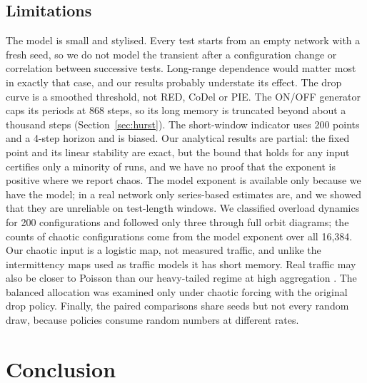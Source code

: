 \documentclass[11pt,a4paper]{article}
\begin{document}
\subsection{Limitations}
The model is small and stylised. Every test starts from an empty network with a fresh seed, so we do not model the transient after a configuration change or correlation between successive tests. Long-range dependence would matter most in exactly that case, and our results probably understate its effect. The drop curve is a smoothed threshold, not RED, CoDel or PIE. The ON/OFF generator caps its periods at 868 steps, so its long memory is truncated beyond about a thousand steps (Section~\ref{sec:hurst}). The short-window indicator uses 200 points and a 4-step horizon and is biased. Our analytical results are partial: the fixed point and its linear stability are exact, but the bound that holds for any input certifies only a minority of runs, and we have no proof that the exponent is positive where we report chaos. The model exponent is available only because we have the model; in a real network only series-based estimates are, and we showed that they are unreliable on test-length windows. We classified overload dynamics for 200 configurations and followed only three through full orbit diagrams; the counts of chaotic configurations come from the model exponent over all 16,384. Our chaotic input is a logistic map, not measured traffic, and unlike the intermittency maps used as traffic models \citep{erramilli1995application,mondragon2001chaotic} it has short memory. Real traffic may also be closer to Poisson than our heavy-tailed regime at high aggregation \citep{cao2003internet,karagiannis2004longrange}. The balanced allocation was examined only under chaotic forcing with the original drop policy. Finally, the paired comparisons share seeds but not every random draw, because policies consume random numbers at different rates.

\section{Conclusion}
\label{sec:conclusion}
\end{document}
